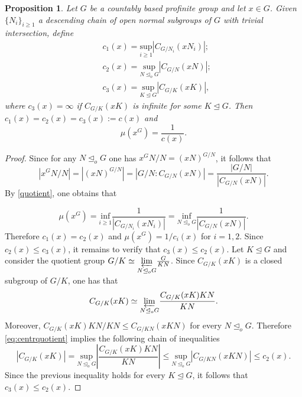 \documentclass[10pt,a4paper]{amsart}
\newtheorem{proposition}{Proposition}
\begin{document}
	\begin{proposition}\label{pr:ccmeasure}
		Let $G$ be a countably based profinite group and let $x\in G$. Given $\{N_i\}_{i\geq 1}$ a descending chain of open normal subgroups of $G$ with trivial intersection, define 
		\begin{align*}
			& c_1(x)=\underset{i\geq 1}{\mathrm{sup}}|C_{G/N_i}(xN_i)|;\\
			& c_2(x)=\underset{N\unlhd_oG}{\mathrm{sup}}|C_{G/N}(xN)|;\\
			& c_3(x)=\underset{K\unlhd G}{\mathrm{sup}}|C_{G/K}(xK)|,
		\end{align*}
		where $c_3(x)=\infty$ if $C_{G/K}(xK)$ is infinite for some $K\unlhd G$. Then $c_1(x)=c_2(x)=c_3(x):=c(x)$ and \begin{equation}\label{eq:ccmeasure}
			\mu(x^G)=\frac{1}{c(x)}.
		\end{equation}
	\end{proposition}

	\begin{proof}
		Since for any $N\unlhd_o G$ one has $x^GN/N=(xN)^{G/N}$, it follows that
		\begin{equation*}\label{eq:orbstab}
			|x^GN/N|=|(xN)^{G/N}|=|G/N:C_{G/N}(xN)|=\frac{|G/N|}{|C_{G/N}(xN)|}. 
		\end{equation*} 
		By \cref{quotient}, one obtains that 
        
		\begin{equation*}
			\mu(x^G)=\underset{i\geq 1}{\mathrm{inf}}\frac{1}{|C_{G/N_i}(xN_i)|}=\underset{N\unlhd_oG}{\mathrm{inf}}\frac{1}{|C_{G/N}(xN)|}. 
		\end{equation*} Therefore $c_1(x)=c_2(x)$ and $\mu(x^G)=1/c_i(x)$ for $i=1,2$. Since $c_2(x)\leq c_3(x)$, it remains to verify that $c_3(x)\leq c_2(x)$. Let $K\unlhd G$ and consider the quotient group $G/K\simeq \underset{N\unlhd_oG}\varprojlim\frac{G}{KN}$.
        Since $C_{G/K}(xK)$ is a closed subgroup of $G/K$, one has that 
		\begin{equation}\label{eq:centrquotient}
			C_{G/K}(xK)\simeq\underset{N\unlhd_oG}\varprojlim\frac{C_{G/K}(xK)KN}{KN}.
		\end{equation}
		Moreover, $C_{G/K}(xK)KN/KN\leq C_{G/KN}(xKN)$ for every $N\unlhd_oG$. Therefore \cref{eq:centrquotient} implies the following chain of inequalities 
		\begin{equation*}
			|C_{G/K}(xK)|=\underset{N\unlhd_oG}{\mathrm{sup}}\left\vert\frac{C_{G/K}(xK)KN}{KN}\right\vert\leq \underset{N\unlhd_oG}{\mathrm{sup}}|C_{G/KN}(xKN)|\leq c_2(x).
		\end{equation*}
		Since the previous inequality holds for every $K\unlhd G$, it follows that $c_3(x)\leq c_2(x)$.
	\end{proof}
\end{document}
